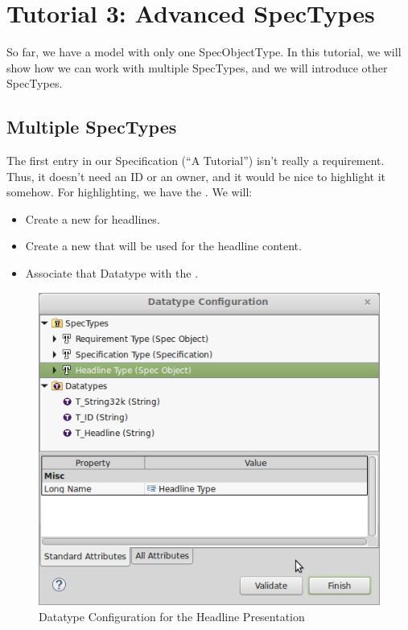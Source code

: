 \section{Tutorial 3: Advanced SpecTypes}

So far, we have a model with only one SpecObjectType.  In this tutorial, we will show how we can work with multiple SpecTypes, and we will introduce other SpecTypes.

\subsection{Multiple SpecTypes}

The first entry in our Specification (``A \pror{} Tutorial'') isn't really a requirement.  Thus, it doesn't need an ID or an owner, and it would be nice to highlight it somehow.  For highlighting, we have the .  We will:

\begin{itemize}

\item
  Create a new  for headlines.
\item
  Create a new  that will be used for the headline content.
\item
  Associate that Datatype with the .
\end{itemize}

\begin{figure}
\centering      
\includegraphics[width=0.8\linewidth]{../rmf-images/datatype_Headline_desc.png}      
\caption{Datatype Configuration for the Headline Presentation}      
\label{fig:headlineConfig}
\end{figure}

